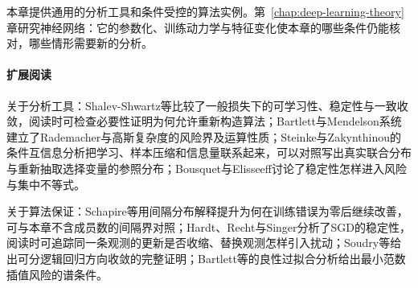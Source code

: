本章提供通用的分析工具和条件受控的算法实例。第~\ref{chap:deep-learning-theory}章研究神经网络：它的参数化、训练动力学与特征变化使本章的哪些条件仍能核对，哪些情形需要新的分析。

\paragraph{扩展阅读}
关于分析工具：Shalev-Shwartz等比较了一般损失下的可学习性、稳定性与一致收敛，阅读时可检查必要性证明为何允许重新构造算法；Bartlett与Mendelson系统建立了Rademacher与高斯复杂度的风险界及运算性质；Steinke与Zakynthinou的条件互信息分析把学习、样本压缩和信息量联系起来，可以对照写出真实联合分布与重新抽取选择变量的参照分布；Bousquet与Elisseeff讨论了稳定性怎样进入风险与集中不等式。

关于算法保证：Schapire等用间隔分布解释提升为何在训练错误为零后继续改善，可与本章不含成员数的间隔界对照；Hardt、Recht与Singer分析了SGD的稳定性，阅读时可追踪同一条观测的更新是否收缩、替换观测怎样引入扰动；Soudry等给出可分逻辑回归方向收敛的完整证明；Bartlett等的良性过拟合分析给出最小范数插值风险的谱条件。
